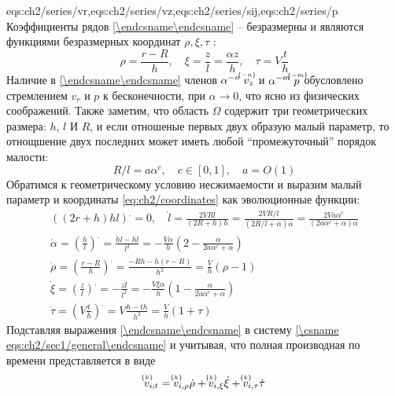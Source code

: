 \expandafter\gdef\csname eqs:ch2/series\endcsname{eqs:ch2/series/vr,eqs:ch2/series/vz,eqs:ch2/series/sij,eqs:ch2/series/p}
Коэффициенты рядов \cref{\csname eqs:ch2/series\endcsname} -- безразмерны и являются функциями безразмерных координат $\rho, \xi, \tau$ :
\begin{equation}
  \label{eq:ch2/coordinates}
  \rho = \frac{r-R}{h}, \quad \xi = \frac{z}{l}=\frac{\alpha z}{h}, \quad \tau = V \frac{t}{h}
\end{equation}
Наличие в \cref{\csname eqs:ch2/series\endcsname} членов $\alpha^{-n} \; \uindex{v}{-n}_{z}$ и $\alpha^{-m} \; \uindex{p}{-m}$ обусловлено стремлением $v_{r}$ и $p$ к бесконечности, при $\alpha\rightarrow 0$, что ясно из физических соображений. Также заметим, что область $\Omega$ содержит три геометрических размера: $h$, $l$ И $R$, и если отношеные первых двух образую малый параметр, то отнощшение двух последних может иметь любой ``промежуточный'' порядок малости:
\begin{equation}
  \label{eq:ch2/sec1/c}
  R/l = a \alpha^c, \quad c\in[0,1], \quad a=O(1)
\end{equation}
Обратимся к геометрическому условию несжимаемости и выразим малый параметр и координаты \cref{eq:ch2/coordinates} как эволюционные функции:
\begin{gather}
  \left(\left(2r+h\right)h l\right)^. = 0, \quad \dot{l} = \frac{2 V R l}{\left(2R + h\right)h}=\frac{2 V R/l}{\left(2R/l + \alpha\right)\alpha}=\frac{2 V a \alpha^c}{\left(2a \alpha^c + \alpha\right)\alpha}\nonumber
  \\
  \dot{\alpha} = \left(\frac{h}{l}\right)^. = \frac{\dot{h}l - h\dot{l}}{l^2} = -\frac{V\alpha}{h}\left(2-\frac{\alpha}{2a\alpha^c+\alpha}\right)
  \\
  \dot{\rho} = \left(\frac{r-R}{h}\right)^. = \frac{-\dot{R} h - \dot{h}\left(r-R\right)}{h^2} = \frac{V}{h}\left(\rho-1\right)
  \\
  \dot{\xi} = \left(\frac{z}{l}\right)^. = -\frac{z \dot{l}}{l^2} = -\frac{V\xi\alpha}{h}\left(1-\frac{\alpha}{2a\alpha^c+\alpha}\right)
  \\
  \dot{\tau} = \left(V \frac{t}{h}\right)^. = V \frac{h - t\dot{h}}{h^2} = \frac{V}{h} \left(1+\tau\right)
\end{gather}
Подставляя выражения \cref{\csname eqs:ch2/series\endcsname} в систему \cref{\csname eqs:ch2/sec1/general\endcsname} и учитывая, что полная производная по времени представляется в виде
\begin{equation*}
  \uindex{v}{k}_{i;t} = \uindex{v}{k}_{i,\rho} \dot{\rho} + \uindex{v}{k}_{i,\xi} \dot{\xi} + \uindex{v}{k}_{i,\tau} \dot{\tau}
\end{equation*}
